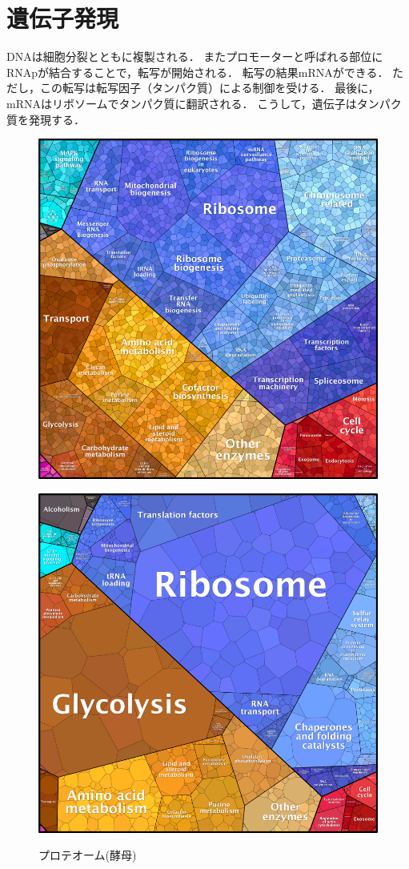 \section{遺伝子発現}

DNAは細胞分裂とともに複製される．
またプロモーターと呼ばれる部位にRNApが結合することで，転写が開始される．
転写の結果mRNAができる．
ただし，この転写は転写因子（タンパク質）による制御を受ける．
最後に，mRNAはリボソームでタンパク質に翻訳される．
こうして，遺伝子はタンパク質を発現する．

\begin{figure}[htbp]
  \begin{minipage}[b]{.5\linewidth}
    \centering
    \includegraphics[width=.8\linewidth]{genome.png}
    \label{fig:prmap_gen}
  \end{minipage}
  \begin{minipage}[b]{.5\linewidth}
    \centering
    \includegraphics[width=.8\linewidth]{proteome2.png}
    \label{fig:prmap_pro}
  \end{minipage}
  \caption{プロテオーム(酵母)}
\end{figure}

